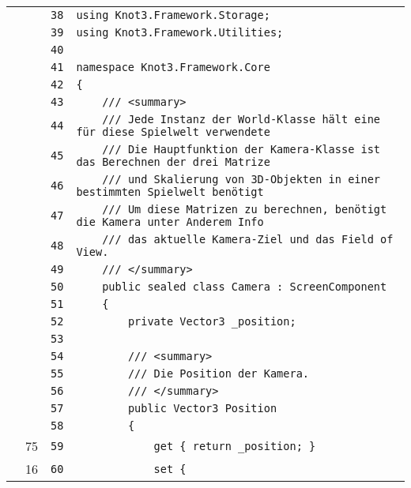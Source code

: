 \documentclass[a4paper,10pt]{article}
\begin{document}
\begin{longtable}[l]{lrrl}
\cellcolor{gray} &  & \verb~38~ & \verb~using Knot3.Framework.Storage;~\\
\cellcolor{gray} &  & \verb~39~ & \verb~using Knot3.Framework.Utilities;~\\
\cellcolor{gray} &  & \verb~40~ & \verb~~\\
\cellcolor{gray} &  & \verb~41~ & \verb~namespace Knot3.Framework.Core~\\
\cellcolor{gray} &  & \verb~42~ & \verb~{~\\
\cellcolor{gray} &  & \verb~43~ & \verb~    /// <summary>~\\
\cellcolor{gray} &  & \verb~44~ & \verb~    /// Jede Instanz der World-Klasse hält eine für diese Spielwelt verwendete~\\
\cellcolor{gray} &  & \verb~45~ & \verb~    /// Die Hauptfunktion der Kamera-Klasse ist das Berechnen der drei Matrize~\\
\cellcolor{gray} &  & \verb~46~ & \verb~    /// und Skalierung von 3D-Objekten in einer bestimmten Spielwelt benötigt ~\\
\cellcolor{gray} &  & \verb~47~ & \verb~    /// Um diese Matrizen zu berechnen, benötigt die Kamera unter Anderem Info~\\
\cellcolor{gray} &  & \verb~48~ & \verb~    /// das aktuelle Kamera-Ziel und das Field of View.~\\
\cellcolor{gray} &  & \verb~49~ & \verb~    /// </summary>~\\
\cellcolor{gray} &  & \verb~50~ & \verb~    public sealed class Camera : ScreenComponent~\\
\cellcolor{gray} &  & \verb~51~ & \verb~    {~\\
\cellcolor{gray} &  & \verb~52~ & \verb~        private Vector3 _position;~\\
\cellcolor{gray} &  & \verb~53~ & \verb~~\\
\cellcolor{gray} &  & \verb~54~ & \verb~        /// <summary>~\\
\cellcolor{gray} &  & \verb~55~ & \verb~        /// Die Position der Kamera.~\\
\cellcolor{gray} &  & \verb~56~ & \verb~        /// </summary>~\\
\cellcolor{gray} &  & \verb~57~ & \verb~        public Vector3 Position~\\
\cellcolor{gray} &  & \verb~58~ & \verb~        {~\\
\cellcolor{green} & 75 & \verb~59~ & \verb~            get { return _position; }~\\
\cellcolor{green} & 16 & \verb~60~ & \verb~            set {~\\

\end{longtable}
\end{document}
